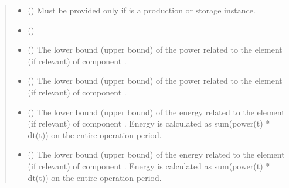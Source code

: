 \documentclass[letterpaper,10pt,english]{sphinxmanual}
\begin{document}
\begin{fulllineitems}
\begin{fulllineitems}
\begin{quote}
\begin{description}
\begin{itemize}
\item {} 
\sphinxAtStartPar
{} (\sphinxstyleliteralemphasis{\sphinxupquote{, }}) \textendash{} Must be provided only if  is a production or storage instance.

\item {} 
\sphinxAtStartPar
{} (\sphinxstyleliteralemphasis{\sphinxupquote{, }}) \textendash{} 

\item {} 
\sphinxAtStartPar
{} (\sphinxstyleliteralemphasis{\sphinxupquote{, }}) \textendash{} The lower bound (upper bound) of the power related to the element  (if relevant) of component .

\item {} 
\sphinxAtStartPar
{} (\sphinxstyleliteralemphasis{\sphinxupquote{, }}) \textendash{} The lower bound (upper bound) of the power related to the element  (if relevant) of component .

\item {} 
\sphinxAtStartPar
{} (\sphinxstyleliteralemphasis{\sphinxupquote{, }}) \textendash{} The lower bound (upper bound) of the energy related to the element  (if relevant) of component .
Energy is calculated as sum(power(t) * dt(t)) on the entire operation period.

\item {} 
\sphinxAtStartPar
{} (\sphinxstyleliteralemphasis{\sphinxupquote{, }}) \textendash{} The lower bound (upper bound) of the energy related to the element  (if relevant) of component .
Energy is calculated as sum(power(t) * dt(t)) on the entire operation period.


\end{itemize}
\end{description}
\end{quote}
\end{fulllineitems}
\end{fulllineitems}
\end{document}
